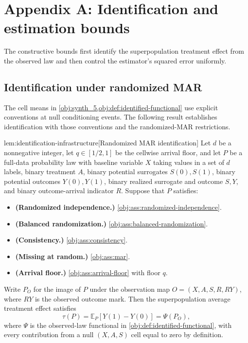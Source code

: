 \section{Appendix A: Identification and estimation bounds}

The constructive bounds first identify the superpopulation treatment effect from the observed law and then control the estimator's squared error uniformly.

\subsection{Identification under randomized MAR}

The cell means in \cref{obj:synth_5,obj:def:identified-functional} use explicit conventions at null conditioning events. The following result establishes identification with those conventions and the randomized-MAR restrictions.

\begin{lemmav}{lem:identification-infrastructure}[Randomized MAR identification]
Let \(d\) be a nonnegative integer, let \(q\in[1/2,1]\) be the cellwise arrival floor, and let \(P\) be a full-data probability law with baseline variable \(X\) taking values in a set of \(d\) labels, binary treatment \(A\), binary potential surrogates \(S(0),S(1)\), binary potential outcomes \(Y(0),Y(1)\), binary realized surrogate and outcome \(S,Y\), and binary outcome-arrival indicator \(R\). Suppose that \(P\) satisfies:
\begin{itemize}
\item \textbf{(Randomized independence.)} \cref{obj:ass:randomized-independence}.
\item \textbf{(Balanced randomization.)} \cref{obj:ass:balanced-randomization}.
\item \textbf{(Consistency.)} \cref{obj:ass:consistency}.
\item \textbf{(Missing at random.)} \cref{obj:ass:mar}.
\item \textbf{(Arrival floor.)} \cref{obj:ass:arrival-floor} with floor \(q\).
\end{itemize}
Write \(P_O\) for the image of \(P\) under the observation map \(O=(X,A,S,R,RY)\), where \(RY\) is the observed outcome mark. Then the superpopulation average treatment effect satisfies
\[
\tau(P)=\mathbb E_P[Y(1)-Y(0)]=\Psi(P_O),
\]
where \(\Psi\) is the observed-law functional in \cref{obj:def:identified-functional}, with every contribution from a null \((X,A,S)\) cell equal to zero by definition.
\end{lemmav}

